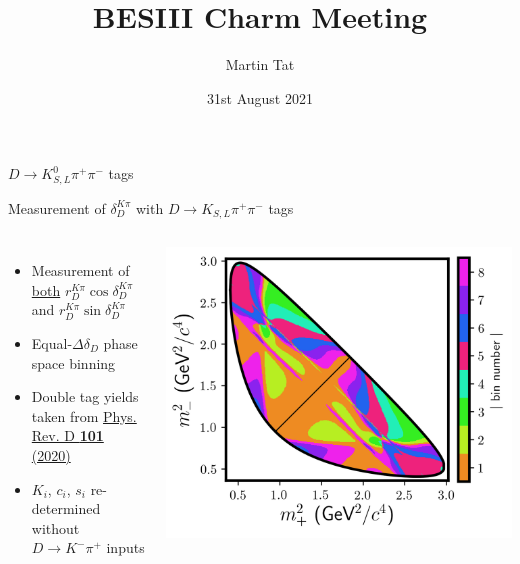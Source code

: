 \documentclass{beamer}
\title[University of Oxford]{BESIII Charm Meeting}
\author{Martin Tat}
\date{31st August 2021}
\begin{document}
\begin{frame}
  \titlepage
\end{frame}


\begin{frame}{$D\to K_{S, L}^0\pi^+\pi^-$ tags}
  \begin{center}
    {\huge Measurement of $\delta_D^{K\pi}$ with $D\to K_{S, L}\pi^+\pi^-$ tags}
  \end{center}
  \begin{columns}
    \begin{itemize}
      \setlength\itemsep{1.0em}
      \item{Measurement of \underline{both} $r_D^{K\pi}\cos\delta_D^{K\pi}$ and $r_D^{K\pi}\sin\delta_D^{K\pi}$}
      \item{Equal-$\Delta\delta_D$ phase space binning}
      \item{Double tag yields taken from \href{https://doi.org/10.1103/PhysRevD.101.112002}{Phys. Rev. D \textbf{101} (2020)}}
      \item{$K_i$, $c_i$, $s_i$ re-determined without $D\to K^-\pi^+$ inputs}
    \end{itemize}
    \centering
    \includegraphics[width=\textwidth]{KsPiPi_equal.png}
  \end{columns}
\end{frame}
\end{document}
